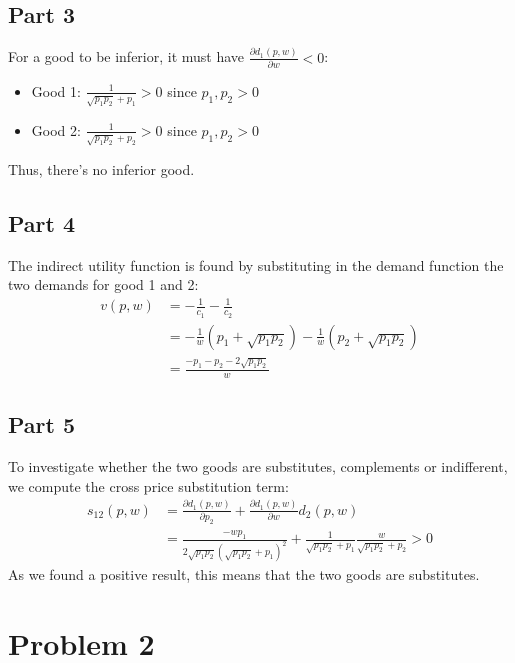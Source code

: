 \documentclass[12pt]{extarticle}
\numberwithin{table}{section}
\numberwithin{figure}{section}
\numberwithin{equation}{section}
\begin{document}
\subsection*{Part 3}
For a good to be inferior, it must have $\frac{\partial d_1(p,w)}{\partial w}<0$:
\begin{itemize}
	\item
	      Good 1: $\frac{1}{\sqrt{p_1p_2}+p_1}>0$ since $p_1,p_2>0$
	\item
	      Good 2: $\frac{1}{\sqrt{p_1p_2}+p_2}>0$ since $p_1,p_2>0$
\end{itemize}
Thus, there's no inferior good.

\subsection*{Part 4}
The indirect utility function is found by substituting in the demand function the two demands for good 1 and 2:
\begin{align}
	v(p,w) & = -\frac{1}{c_1}-\frac{1}{c_2}                                   \\
	       & = -\frac{1}{w}(p_1+\sqrt{p_1p_2})-\frac{1}{w}(p_2+\sqrt{p_1p_2}) \\
	       & = \frac{-p_1-p_2-2\sqrt{p_1p_2}}{w}
\end{align}

\subsection*{Part 5}
To investigate whether the two goods are substitutes, complements or indifferent, we compute the cross price substitution term:
\begin{align}
	s_{12}(p,w) & = \frac{\partial d_1(p,w)}{\partial p_2}+ \frac{\partial d_1(p,w)}{\partial w }d_2(p,w)                      \\
	            & =\frac{-wp_1}{2\sqrt{p_1p_2}(\sqrt{p_1p_2}+p_1)^2}+ \frac{1}{\sqrt{p_1p_2}+p_1}\frac{w}{\sqrt{p_1p_2}+p_2}>0
\end{align}
As we found a positive result, this means that the two goods are substitutes.

\section*{Problem 2}
\end{document}
